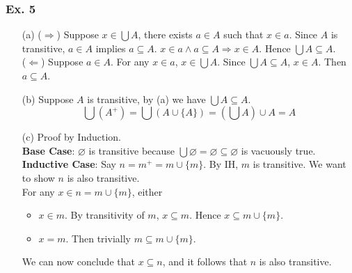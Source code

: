 \documentclass[aspectratio=169]{beamer}
\begin{document}
\begin{frame}
  \frametitle{Ex. 5}
  \begin{itemize}
    \item[(a)] ($\Rightarrow$) Suppose $x\in\bigcup A$, there exists $a\in A$ such that $x\in a$. Since $A$ is transitive, $a\in A$ implies
    $a\subseteq A$. $x\in a \land a\subseteq A \Rightarrow x\in A$. Hence $\bigcup A \subseteq A$.\\
    ($\Leftarrow$) Suppose $a\in A$. For any $x\in a$, $x\in \bigcup A$. Since $\bigcup A\subseteq A$, $x\in A$. Then $a\subseteq A$.
    \item[(b)] Suppose $A$ is transitive, by (a) we have $\bigcup A \subseteq A$.
    \begin{equation*}
      \bigcup \left(A^+\right) = \bigcup \left(A\cup \{A\}\right) = \left(\bigcup A\right) \cup A = A
    \end{equation*}
    \item[(c)] Proof by Induction. \\
    \textbf{Base Case}: $\varnothing $ is transitive because $\bigcup \varnothing = \varnothing \subseteq \varnothing$ is vacuously true. \\
    \textbf{Inductive Case}: Say $n = m^+ = m \cup \{m\}$. By IH, $m$ is transitive. We want to show $n$ is also transitive. \\
    For any $x\in n = m \cup \{m\}$, either
    \begin{itemize}
      \item $x\in m$. By transitivity of $m$, $x\subseteq m$. Hence $x\subseteq m \cup \{m\}$.
      \item $x = m$. Then trivially $m\subseteq m \cup \{m\}$.
    \end{itemize}
    We can now conclude that $x\subseteq n$, and it follows that $n$ is also transitive.
  \end{itemize}
\end{frame}
\end{document}
